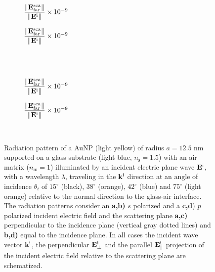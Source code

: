 \begin{figure}[h!]
    \centering
    \def\svgwidth{.8\textwidth}
    \hspace*{-.215\textwidth}%
    \vspace*{-.5em}%
        \begin{subfigure}{.32\textwidth}\caption{\footnotesize$\dfrac{\norm{\vb{E}^\text{sca}_\text{far}}}{\norm{\vb{E}^\text{i}}} \times 10^{-9}$  }\label{sfig:Far:SuppObl:s:a}\end{subfigure}%
        \begin{subfigure}{.4\textwidth}\caption{\footnotesize$\dfrac{\norm{\vb{E}^\text{sca}_\text{far}}}{\norm{\vb{E}^\text{i}}} \times 10^{-9}$  }\label{sfig:Far:SuppObl:s:b}\end{subfigure}\\
    \\
    \def\svgwidth{.8\textwidth}
    \hspace*{-.215\textwidth}%
    \vspace*{-.5em}%
        \begin{subfigure}{.32\textwidth}\caption{\footnotesize$\dfrac{\norm{\vb{E}^\text{sca}_\text{far}}}{\norm{\vb{E}^\text{i}}} \times 10^{-9}$  }\label{sfig:Far:SuppObl:p:c}\end{subfigure}%
        \begin{subfigure}{.4\textwidth}\caption{\footnotesize$\dfrac{\norm{\vb{E}^\text{sca}_\text{far}}}{\norm{\vb{E}^\text{i}}} \times 10^{-9}$  }\label{sfig:Far:SuppObl:p:d}\end{subfigure}\\
    \caption[  Radiation pattern of a AuNP supported on a substrate illuminated at oblique incidence]{Radiation pattern of a AuNP (light yellow) of radius $a = 12.5$ nm supported on a glass substrate (light blue, $n_\text{s} = 1.5$) with an air matrix ($n_\text{m} = 1$) illuminated by an incident electric plane wave $\vb{E}^\text{i}$, with a wavelength $\lambda$, traveling in the $\vb{k}^\text{i}$ direction at an angle of incidence $\theta_i$ of $15^\circ$ (black),  $38^\circ$ (orange),  $42^\circ$ (blue) and  $75^\circ$ (light orange) relative to the normal direction to the glass-air interface. The radiation patterns consider an \textbf{a,b)} $s$ polarized and  a \textbf{c,d}) $p$ polarized incident electric field and the scattering plane \textbf{a,c)} perpendicular to the incidence plane (vertical gray dotted lines) and \textbf{b,d)} equal to the incidence plane. In all cases the incident wave vector $\vb{k}^\text{i}$, the perpendicular $\vb{E}_\perp^\text{i}$ and the  parallel $\vb{E}_\parallel^\text{i}$ projection of the incident electric field relative to the scattering plane are schematized.%
    }
    \label{fig:Far:SuppObl}
\end{figure}


